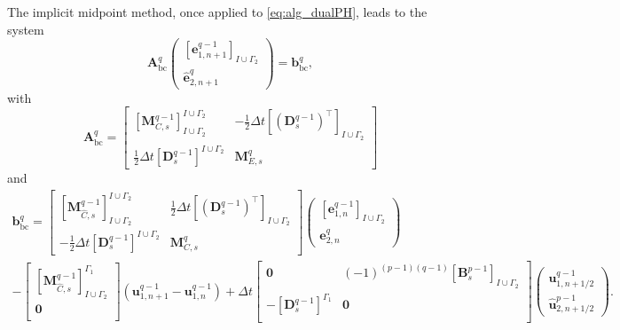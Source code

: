 \documentclass{elsarticle}
\newcommand*{\dual}[1]{\ensuremath{\widehat{#1}}}
\begin{document}
The implicit midpoint method, once applied to \eqref{eq:alg_dualPH}, leads to the system
\begin{equation}\label{eq:timediscr_dual}
    \mathbf{A}^{q}_{\mathrm{bc}}
    \begin{pmatrix}
    [\mathbf{e}^{q-1}_{1, n+1}]_{I\cup \Gamma_2} \\ \dual{\mathbf{e}}^q_{2, n+1}
    \end{pmatrix}
    = \mathbf{b}^{q}_{\mathrm{bc}},
\end{equation}
with
\begin{equation}
\mathbf{A}^{q}_{\mathrm{bc}} =
    \begin{bmatrix}
        [\mathbf{M}^{q-1}_{C, s}]^{I\cup \Gamma_2}_{I\cup \Gamma_2} & -\frac{1}{2}\Delta t [(\mathbf{D}^{q-1}_s)^\top]_{I\cup \Gamma_2} \\
        \frac{1}{2}\Delta t [\mathbf{D}_{s}^{q-1}]^{I\cup \Gamma_2} & \mathbf{M}^{q}_{E, s}
    \end{bmatrix}
\end{equation}
and 
\begin{equation}
\begin{aligned}
\mathbf{b}^{q}_{\mathrm{bc}} = 
\begin{bmatrix}
        [\mathbf{M}^{q-1}_{\dual{C}, s}]^{I\cup \Gamma_2}_{I\cup \Gamma_2} & \frac{1}{2}\Delta t [(\mathbf{D}^{q-1}_s)^\top]_{I\cup \Gamma_2} \\
        -\frac{1}{2}\Delta t [\mathbf{D}_{s}^{q-1}]^{I\cup \Gamma_2} & \mathbf{M}^{q}_{{C}, s}
\end{bmatrix}
    \begin{pmatrix}
    [\mathbf{e}^{q-1}_{1, n}]_{I\cup \Gamma_2} \\ {\mathbf{e}}^q_{2, n}
    \end{pmatrix} \\
    -
    \begin{bmatrix}
        [\mathbf{M}^{q-1}_{\dual{C}, s}]_{I\cup \Gamma_2}^{\Gamma_1} \\
        \mathbf{0} \\
    \end{bmatrix}(\mathbf{u}^{q-1}_{1, n+1} - \mathbf{u}^{q-1}_{1, n}) 
    + \Delta t \begin{bmatrix}
        \mathbf{0} & (-1)^{(p-1)(q-1)}[\mathbf{B}^{p-1}_{s}]_{I \cup \Gamma_2} \\
        -[\mathbf{D}^{q-1}_s]^{\Gamma_1} & \mathbf{0}\\
    \end{bmatrix}
    \begin{pmatrix}
        \mathbf{u}^{q-1}_{1, n+1/2} \\
        \dual{\mathbf{u}}^{p-1}_{2, n+1/2}
    \end{pmatrix}.
\end{aligned}
\end{equation}
\end{document}
